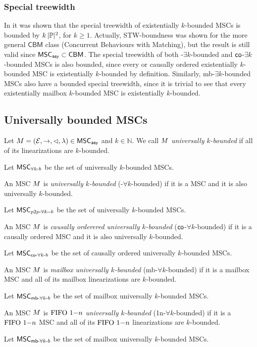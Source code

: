 \subsubsection{Special treewidth}

In \cite[Lemma 5.37]{DBLP:journals/corr/abs-1904-06942} it was shown that the special treewidth of existentially $k$-bounded MSCs is bounded by $k\,|\mathbb{P}|^2$, for $k \ge 1$. Actually, STW-boundness was shown for the more general $\mathsf{CBM}$ class (Concurrent Behaviours with Matching), but the result is still valid since $\mathsf{MSC}_{\mathsf{asy}} \subset \mathsf{CBM}$.  The special treewidth of both \pp-$\exists k$-bounded and $\mathsf{co}$-$\exists k$-bounded MSCs is also bounded, since every \pp or causally ordered existentially $k$-bounded MSC is existentially $k$-bounded by definition. Similarly, mb-$\exists k$-bounded MSCs also have a bounded special treewidth, since it is trivial to see that every existentially mailbox $k$-bounded MSC is existentially $k$-bounded.

\subsection{Universally bounded MSCs}

\begin{definition}\label{def:uk_bounded_msc}
	Let $M = (\mathcal{E}, \rightarrow, \lhd, \lambda) \in \mathsf{MSC}_{\mathsf{asy}}$ and $k \in \mathbb{N}$. We call $M$ \emph{universally $k$-bounded} if all of its linearizations are $k$-bounded.
\end{definition}
Let $\mathsf{MSC}_{\forall k\text{-}b}$ be the set of universally $k$-bounded MSCs.
\begin{definition}
	An MSC $M$ is \emph{\pp universally $k$-bounded} (\pp-$\forall k$-bounded) if it is a \pp MSC and it is also universally $k$-bounded.
\end{definition}
Let $\mathsf{MSC}_{p2p\text{-}\forall k\text{-}\text{-}b}$ be the set of \pp universally $k$-bounded MSCs.
\begin{definition}
	An MSC $M$ is \emph{causally orderered universally $k$-bounded} ($\mathsf{co}$-$\forall k$-bounded) if it is a causally ordered MSC and it is also universally $k$-bounded.
\end{definition}
Let $\mathsf{MSC}_{\mathsf{co}\text{-}\forall k\text{-}b}$ be the set of causally ordered universally $k$-bounded MSCs.
\begin{definition}
	An MSC $M$ is \emph{mailbox universally $k$-bounded} (mb-$\forall k$-bounded) if it is a mailbox MSC and all of its mailbox linearizations are $k$-bounded.
\end{definition}
Let $\mathsf{MSC}_{\mathsf{mb}\text{-}\forall k\text{-}b}$ be the set of mailbox universally $k$-bounded MSCs.
\begin{definition}
	An MSC $M$ is \emph{$\text{FIFO } 1\mathsf{-}n$ universally $k$-bounded} (1n-$\forall k$-bounded) if it is a $\text{FIFO } 1\mathsf{-}n$ MSC and all of its $\text{FIFO } 1\mathsf{-}n$ linearizations are $k$-bounded.
\end{definition}
Let $\mathsf{MSC}_{\mathsf{mb}\text{-}\forall k\text{-}b}$ be the set of mailbox universally $k$-bounded MSCs.

